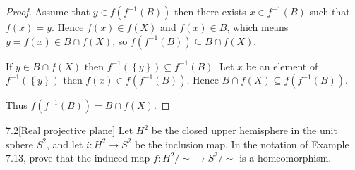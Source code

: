 \begin{proof}
	Assume that \( y \in f(f^{-1}(B)) \) then there exists \( x \in f^{-1}(B) \) such that \( f(x) = y \). Hence \( f(x) \in f(X) \) and \( f(x) \in B \), which means \( y = f(x) \in B \cap f(X) \), so \( f(f^{-1}(B)) \subseteq B \cap f(X) \).

	If \( y \in B \cap f(X) \) then \( f^{-1}(\left\{ y \right\}) \subseteq f^{-1}(B)\). Let \( x \) be an element of \( f^{-1}(\left\{ y \right\}) \) then \( f(x) \in f(f^{-1}(B)) \). Hence \( B \cap f(X) \subseteq f(f^{-1}(B)) \).

	Thus \( f(f^{-1}(B)) = B \cap f(X) \).
\end{proof}

\begin{problem}{7.2}[Real projective plane]
Let \( H^{2} \) be the closed upper hemisphere in the unit sphere \( S^{2} \), and let \( i: H^{2} \to S^{2} \) be the inclusion map. In the notation of Example 7.13, prove that the induced map \( f: H^{2}/\!\sim \to S^{2}/\!\sim \) is a homeomorphism.
\end{problem}

